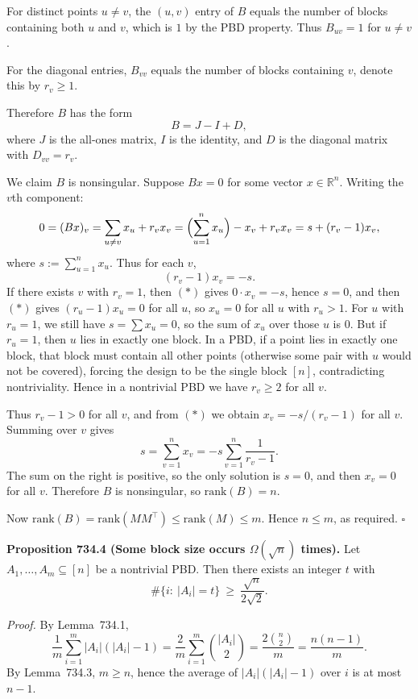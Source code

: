 For distinct points $u\neq v$, the $(u,v)$ entry of $B$ equals the number of blocks containing both $u$ and $v$, which is $1$ by the PBD property. Thus $B_{uv}=1$ for $u\neq v$.

For the diagonal entries, $B_{vv}$ equals the number of blocks containing $v$, denote this by $r_v\ge 1$.

Therefore $B$ has the form
\[
B = J - I + D,
\]
where $J$ is the all-ones matrix, $I$ is the identity, and $D$ is the diagonal matrix with $D_{vv}=r_v$.

We claim $B$ is nonsingular. Suppose $Bx=0$ for some vector $x\in\mathbb R^n$. Writing the $v$th component:
\[
0=(Bx)_v = \sum_{u\neq v} x_u + r_v x_v = \Bigl(\sum_{u=1}^n x_u\Bigr) - x_v + r_v x_v = s + (r_v-1)x_v,
\]
where $s:=\sum_{u=1}^n x_u$.
Thus for each $v$,
\[
(r_v-1)x_v = -s. \tag{$\ast$}
\]
If there exists $v$ with $r_v=1$, then $(\ast)$ gives $0\cdot x_v=-s$, hence $s=0$, and then $(\ast)$ gives $(r_u-1)x_u=0$ for all $u$, so $x_u=0$ for all $u$ with $r_u>1$. For $u$ with $r_u=1$, we still have $s=\sum x_u=0$, so the sum of $x_u$ over those $u$ is $0$. But if $r_u=1$, then $u$ lies in exactly one block. In a PBD, if a point lies in exactly one block, that block must contain all other points (otherwise some pair with $u$ would not be covered), forcing the design to be the single block $[n]$, contradicting nontriviality. Hence in a nontrivial PBD we have $r_v\ge 2$ for all $v$.

Thus $r_v-1>0$ for all $v$, and from $(\ast)$ we obtain $x_v = -s/(r_v-1)$ for all $v$. Summing over $v$ gives
\[
s=\sum_{v=1}^n x_v = -s\sum_{v=1}^n \frac{1}{r_v-1}.
\]
The sum on the right is positive, so the only solution is $s=0$, and then $x_v=0$ for all $v$. Therefore $B$ is nonsingular, so $\mathrm{rank}(B)=n$.

Now $\mathrm{rank}(B)=\mathrm{rank}(MM^\top)\le \mathrm{rank}(M)\le m$. Hence $n\le m$, as required. \hfill $\square$

\medskip
\noindent\textbf{Proposition 734.4 (Some block size occurs $\Omega(\sqrt n)$ times).}
Let $A_1,\dots,A_m\subseteq[n]$ be a nontrivial PBD. Then there exists an integer $t$ with
\[
\#\{i:\ |A_i|=t\}\ \ge\ \frac{\sqrt n}{2\sqrt 2}.
\]

\noindent\emph{Proof.}
By Lemma~734.1,
\[
\frac{1}{m}\sum_{i=1}^m |A_i|(|A_i|-1)=\frac{2}{m}\sum_{i=1}^m \binom{|A_i|}{2}=\frac{2\binom{n}{2}}{m}=\frac{n(n-1)}{m}.
\]
By Lemma~734.3, $m\ge n$, hence the average of $|A_i|(|A_i|-1)$ over $i$ is at most $n-1$.

